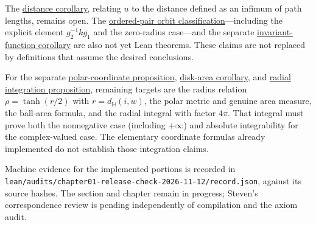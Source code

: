 The \hyperref[hyperbolic.point-pair-distance]{distance corollary}, relating $u$ to the distance defined as an infimum of path lengths, remains open. The \hyperref[hyperbolic.pair-orbits]{ordered-pair orbit classification}---including the explicit element $g_2^{-1}kg_1$ and the zero-radius case---and the separate \hyperref[hyperbolic.radial-functions]{invariant-function corollary} are also not yet Lean theorems. These claims are not replaced by definitions that assume the desired conclusions.

For the separate \hyperref[hyperbolic.polar-coordinates]{polar-coordinate proposition}, \hyperref[hyperbolic.ball-area]{disk-area corollary}, and \hyperref[hyperbolic.radial-integration]{radial integration proposition}, remaining targets are the radius relation $\rho=\tanh(r/2)$ with $r=d_{\mathbb H}(i,w)$, the polar metric and genuine area measure, the ball-area formula, and the radial integral with factor $4\pi$. That integral must prove both the nonnegative case (including $+\infty$) and absolute integrability for the complex-valued case. The elementary coordinate formulas already implemented do not establish those integration claims.

Machine evidence for the implemented portions is recorded in \texttt{lean/audits/chapter01-release-check-2026-11-12/record.json}, against its source hashes. The section and chapter remain in progress; Steven's correspondence review is pending independently of compilation and the axiom audit.
